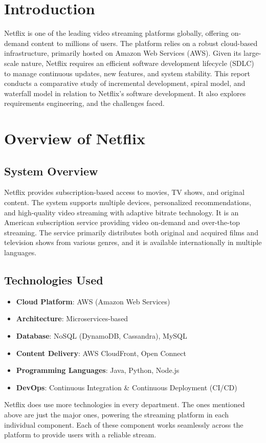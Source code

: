 \documentclass[a4paper,10pt,twoside]{article}
\begin{document}
\tableofcontents
\newpage

\section{Introduction}
Netflix is one of the leading video streaming platforms globally, offering on-demand content to millions of users. The platform relies on a robust cloud-based infrastructure, primarily hosted on Amazon Web Services (AWS). Given its large-scale nature, Netflix requires an efficient software development lifecycle (SDLC) to manage continuous updates, new features, and system stability.
This report conducts a comparative study of incremental development, spiral model, and waterfall model in relation to Netflix’s software development. It also explores requirements engineering, and the challenges faced.

\section{Overview of Netflix}
\subsection{System Overview}
Netflix provides subscription-based access to movies, TV shows, and original content. The system supports multiple devices, personalized recommendations, and high-quality video streaming with adaptive bitrate technology. It is an American subscription service providing video on-demand and over-the-top streaming. The service primarily distributes both original and acquired films and television shows from various genres, and it is available internationally in multiple languages.

\subsection{Technologies Used}
\begin{itemize}
    \item \textbf{Cloud Platform}: AWS (Amazon Web Services)
    \item \textbf{Architecture}: Microservices-based
    \item \textbf{Database}: NoSQL (DynamoDB, Cassandra), MySQL
    \item \textbf{Content Delivery}: AWS CloudFront, Open Connect
    \item \textbf{Programming Languages}: Java, Python, Node.js
    \item \textbf{DevOps}: Continuous Integration \& Continuous Deployment (CI/CD)
\end{itemize}
Netflix does use more technologies in every department. The ones mentioned above are just the major ones, powering the streaming platform in each individual component. Each of these component works seamlessly across the platform to provide users with a reliable stream. 
\end{document}
